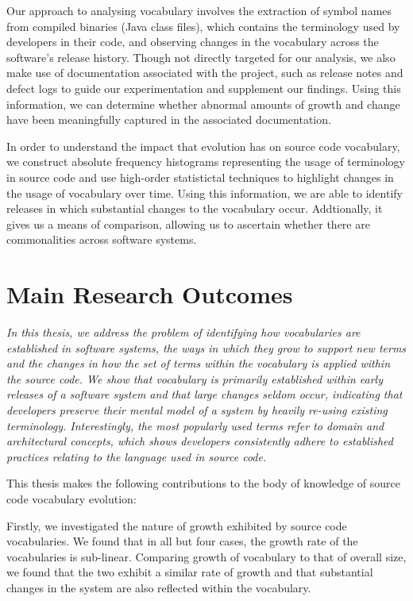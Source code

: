 Our approach to analysing vocabulary involves the extraction of symbol names from compiled binaries (Java class files), which contains the terminology used by developers in their code, and observing changes in the vocabulary across the software's release history. Though not directly targeted for our analysis, we also make use of documentation associated with the project, such as release notes and defect logs to guide our experimentation and supplement our findings. Using this information, we can determine whether abnormal amounts of growth and change have been meaningfully captured in the associated documentation.

In order to understand the impact that evolution has on source code vocabulary, we construct absolute frequency histograms representing the usage of terminology in source code and use high-order statistictal techniques to highlight changes in the usage of vocabulary over time. Using this information, we are able to identify releases in which substantial changes to the vocabulary occur. Addtionally, it gives us a means of comparison, allowing us to ascertain whether there are commonalities across software systems.


\section{Main Research Outcomes} %
\label{sec:main_research_outcomes}

\emph{In this thesis, we address the problem of identifying how vocabularies are established in software systems, the ways in which they grow to support new terms and the changes in how the set of terms within the vocabulary is applied within the source code. We show that vocabulary is primarily established within early releases of a software system and that large changes seldom occur, indicating that developers preserve their mental model of a system by heavily re-using existing terminology. Interestingly, the most popularly used terms refer to domain and architectural concepts, which shows developers consistently adhere to established practices relating to the language used in source code.}

This thesis makes the following contributions to the body of knowledge of source code vocabulary evolution:

Firstly, we investigated the nature of growth exhibited by source code vocabularies. We found that in all but four cases, the growth rate of the vocabularies is sub-linear. Comparing growth of vocabulary to that of overall size, we found that the two exhibit a similar rate of growth and that substantial changes in the system are also reflected within the vocabulary.


